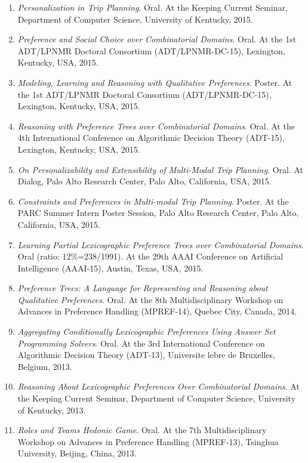 \begin{enumerate}  \itemsep -3pt
	\item \textit{Personalization in Trip Planning}. Oral.
		At the Keeping Current Seminar, Department of Computer Science,
		University of Kentucky, 2015.
	\item \textit{Preference and Social Choice over Combinatorial Domains}. Oral. 
		At the 1st ADT/LPNMR Doctoral Consortium (ADT/LPNMR-DC-15),
		Lexington, Kentucky, USA, 2015.
	\item \textit{Modeling, Learning and Reasoning with Qualitative Preferences}. Poster. 
		At the 1st ADT/LPNMR Doctoral Consortium (ADT/LPNMR-DC-15),
		Lexington, Kentucky, USA, 2015.
	\item \textit{Reasoning with Preference Trees over Combinatorial Domains}. Oral.
		At the 4th International Conference on Algorithmic Decision Theory (ADT-15),
		Lexington, Kentucky, USA, 2015.
	\item \textit{On Personalizability and Extensibility of Multi-Modal Trip Planning}. Oral.
		At Dialog, Palo Alto Research Center, Palo Alto, California, USA, 2015.
	\item \textit{Constraints and Preferences in Multi-modal Trip Planning}. Poster.
		At the PARC Summer Intern Poster Session, Palo Alto Research Center, 
		Palo Alto, California, USA, 2015.
	\item \textit{Learning Partial Lexicographic Preference Trees over Combinatorial Domains}. 
		Oral (ratio: 12\%=238/1991).
		At the 29th AAAI Conference on Artificial Intelligence (AAAI-15), 
		Austin, Texas, USA, 2015.
	\item \textit{Preference Trees: A Language for Representing and Reasoning about Qualitative Preferences}. Oral.
		At the 8th Multidisciplinary Workshop on Advances in Preference Handling (MPREF-14), 
		Quebec City, Canada, 2014.
	\item \textit{Aggregating Conditionally Lexicographic Preferences Using Answer Set Programming Solvers}. Oral.
		At the 3rd International Conference on Algorithmic Decision Theory (ADT-13),
		Universite lebre de Bruxelles, Belgium, 2013.
	\item \textit{Reasoning About Lexicographic Preferences Over Combinatorial Domains}.
		At the Keeping Current Seminar, Department of Computer Science, 
		University of Kentucky, 2013.
	\item \textit{Roles and Teams Hedonic Game}. Oral.
		At the 7th Multidisciplinary Workshop on Advances in Preference Handling (MPREF-13),
		Tsinghua University, Beijing, China, 2013.

\end{enumerate}
